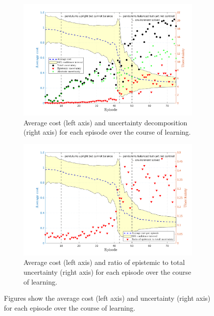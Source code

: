  
\begin{figure}[htp!]    
  \begin{subfigure}[b]{1\linewidth}
    \centering
    \includegraphics[height=0.4\textheight,width=1\textwidth]{Chapter3/Figures/cdp_uncertainty.png}
    \caption{Average cost (left axis) and uncertainty decomposition (right axis) for each episode over the course of learning.} 
    \label{Fig:Re-cdp-uncertainty-decomposition} 
  \end{subfigure} 
  \begin{subfigure}[b]{1\linewidth}
    \centering
    \includegraphics[height=0.4\textheight,width=1\textwidth]{Chapter3/Figures/cdp_uncertainty_normalised.png} 
    \caption{Average cost (left axis) and ratio of epistemic to total uncertainty (right axis) for each episode over the course of learning.} 
    \label{Fig:Re-cdp-uncertainty-normalised} 
  \end{subfigure} 
\caption[Uncertainty decomposition for \textbf{cart-double-pole} environment]{Figures show the average cost (left axis) and uncertainty (right axis) for each episode over the course of learning.}
\label{Fig:Re-cdp-full-uncertainty} 
\end{figure}
%
%
%
%


